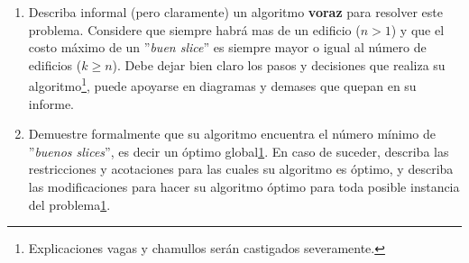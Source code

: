 \documentclass[spanish, fleqn]{article}
\begin{document}
\newpage
\begin{enumerate}
    \item Describa informal (pero claramente) un algoritmo \textbf{voraz} para resolver este problema. Considere que siempre habrá mas de un edificio ($n > 1$) y que el costo máximo de un ''\emph{buen slice}'' es siempre mayor o igual al número de edificios ($k \geq n$). Debe dejar bien claro los pasos y decisiones que realiza su algoritmo\footnote{\label{note1}Explicaciones vagas y chamullos serán castigados severamente.}, puede apoyarse en diagramas y demases que quepan en su informe.
    \item Demuestre formalmente que su algoritmo encuentra el número mínimo de ''\emph{buenos slices}'', es decir un óptimo global\cref{note1}. En caso de suceder, describa las restricciones y acotaciones para las cuales su algoritmo es óptimo, y describa las modificaciones para hacer su algoritmo óptimo para toda posible instancia del problema\cref{note1}.
\end{enumerate}

%

\end{document}
